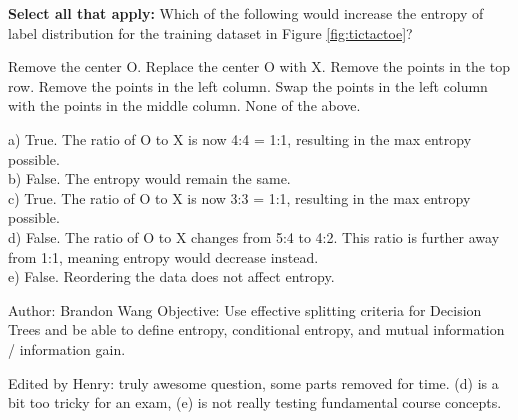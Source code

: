 \begin{parts}
\begin{subparts}
    \subpart[3] \textbf{Select all that apply:} Which of the following would increase the entropy of label distribution for the training dataset in Figure \ref{fig:tictactoe}?
        {
        \checkboxchar{$\Box$} \checkedchar{$\blacksquare$}
        \begin{checkboxes}
            \choice Remove the center O.
            \choice Replace the center O with X. 
            \choice Remove the points in the top row.
            \choice Remove the points in the left column.
            \choice Swap the points in the left column with the points in the middle column.
            \choice None of the above.
        \end{checkboxes}
        }
        \begin{soln}
            a) True. The ratio of O to X is now 4:4 = 1:1, resulting in the max entropy possible.\\
            b) False. The entropy would remain the same.\\
            c) True. The ratio of O to X is now 3:3 = 1:1, resulting in the max entropy possible.\\
            d) False. The ratio of O to X changes from 5:4 to 4:2. This ratio is further away from 1:1, meaning entropy would decrease instead.\\
            e) False. Reordering the data does not affect entropy.
        \end{soln}
    
    \begin{qauthor}
    Author: Brandon Wang
    Objective: Use effective splitting criteria for Decision Trees and be able to define entropy, conditional entropy, and mutual information / information gain.
    
    Edited by Henry: truly awesome question, some parts removed for time. (d) is a bit too tricky for an exam, (e) is not really testing fundamental course concepts.
    \end{qauthor}
    \end{subparts}
        

    

\end{parts}
